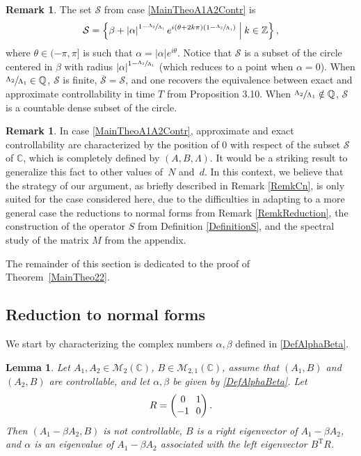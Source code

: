 \documentclass[10pt]{amsart}
\theoremstyle{plain}
\newtheorem{lemm}[theo]{Lemma}
\theoremstyle{definition}
\newtheorem{remk}[theo]{Remark}
\newcommand{\midsuchthat}{\;\middle|\:}
\newcommand{\transp}{{\scriptscriptstyle\mathrm{T}}}
\newcommand{\abs}[1]{\left\lvert #1\right \rvert}
\begin{document}
\begin{remk}
The set $\mathcal S$ from case \eqref{MainTheoA1A2Contr} is
\[
\mathcal S = \left\{\beta + \abs{\alpha}^{1 - \sfrac{\Lambda_2}{\Lambda_1}} e^{i (\theta + 2 k \pi)\left(1 - \sfrac{\Lambda_2}{\Lambda_1}\right)} \midsuchthat k \in \mathbb Z\right\},
\]
where $\theta \in (-\pi, \pi]$ is such that $\alpha = \abs{\alpha} e^{i\theta}$. Notice that $\mathcal S$ is a subset of the circle centered in $\beta$ with radius $\abs{\alpha}^{1 - \sfrac{\Lambda_2}{\Lambda_1}}$ (which reduces to a point when $\alpha = 0$). When $\sfrac{\Lambda_2}{\Lambda_1} \in \mathbb Q$, $\mathcal S$ is finite, $\overline{\mathcal S} = \mathcal S$, and one recovers the equivalence between exact and approximate controllability in time $T$ from Proposition 3.10. When $\sfrac{\Lambda_2}{\Lambda_1} \notin \mathbb Q$, $\mathcal S$ is a countable dense subset of the circle.
\end{remk}

\begin{remk}
In case \eqref{MainTheoA1A2Contr}, approximate and exact controllability are characterized by the position of $0$ with respect of the subset $\mathcal S$ of $\mathbb C$, which is completely defined by $(A, B, \Lambda)$. It would be a striking result to generalize this fact to other values of~$N$ and~$d$. In this context, we believe that the strategy of our argument, as briefly described in Remark \ref{RemkCn}, is only suited for the case considered here, due to the difficulties in adapting to a more general case the reductions to normal forms from Remark \ref{RemkReduction}, the construction of the operator $S$ from Definition \ref{DefinitionS}, and the spectral study of the matrix $M$ from the appendix.
\end{remk}

The remainder of this section is dedicated to the proof of Theorem~\ref{MainTheo22}.

\subsection{Reduction to normal forms}
\label{SecReduction}

We start by characterizing the complex numbers $\alpha, \beta$ defined in \eqref{DefAlphaBeta}.

\begin{lemm}
\label{LemmAlphaEigenvalue}
Let $A_1, A_2 \in \mathcal M_2(\mathbb C)$, $B \in \mathcal M_{2, 1}(\mathbb C)$, assume that $(A_1, B)$ and $(A_2, B)$ are controllable, and let $\alpha, \beta$ be given by \eqref{DefAlphaBeta}. Let
\begin{equation}
\label{DefR}\arraycolsep3.5pt
R = \begin{pmatrix}
0 & 1 \\
-1 & 0 \\
\end{pmatrix}.
\end{equation}
Then $(A_1 - \beta A_2, B)$ is not controllable, $B$ is a right eigenvector of $A_1 - \beta A_2$, and $\alpha$ is an eigenvalue of $A_1 - \beta A_2$ associated with the left eigenvector $B^\transp R$.
\end{lemm}
\end{document}
